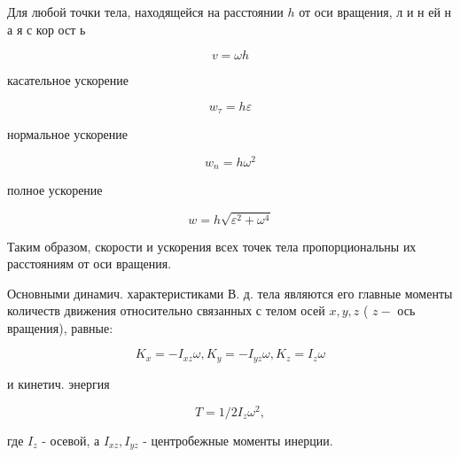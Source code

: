 \documentclass[10pt]{article}
\begin{document}
Для любой точки тела, находящейся на расстоянии $h$ от оси вращения, л и н ей н а я с кор ост ь



\[

v=\omega h

\]



касательное ускорение



\[

w_{\tau}=h \varepsilon

\]



нормальное ускорение



\[

w_{n}=h \omega^{2}

\]



полное ускорение



\[

w=h \sqrt{\varepsilon^{2}+\omega^{4}}

\]



Таким образом, скорости и ускорения всех точек тела пропорциональны их расстояниям от оси вращения.



Основными динамич. характеристиками В. д. тела являются его главные моменты количеств движения относительно связанных с телом осей $x, y, z$ ( $z-$ ось вращения), равные:



\[

K_{x}=-I_{x z} \omega, K_{y}=-I_{y z} \omega, K_{z}=I_{z} \omega

\]



и кинетич. энергия



\[

T=1 / 2 I_{z} \omega^{2},

\]



где $I_{z}$ - осевой, а $I_{x z}, I_{y z}$ - центробежные моменты инерции.
\end{document}
